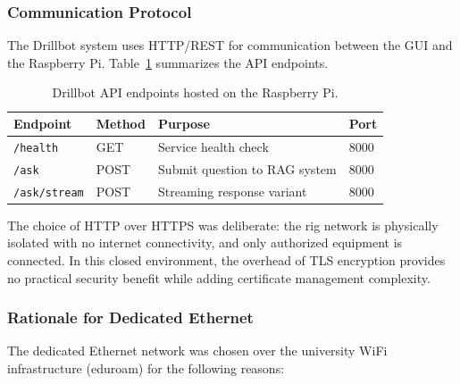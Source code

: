 \subsubsection{Communication Protocol}

The Drillbot system uses HTTP/REST for communication between the GUI and the Raspberry Pi. Table~\ref{tab:api-endpoints} summarizes the API endpoints.

\begin{table}[htbp]
    \centering
    \caption{Drillbot API endpoints hosted on the Raspberry Pi.}
    \label{tab:api-endpoints}
    \begin{tabular}{llll}
        \toprule
        \textbf{Endpoint} & \textbf{Method} & \textbf{Purpose} & \textbf{Port} \\
        \midrule
        \texttt{/health} & GET & Service health check & 8000 \\
        \texttt{/ask} & POST & Submit question to RAG system & 8000 \\
        \texttt{/ask/stream} & POST & Streaming response variant & 8000 \\
        \bottomrule
    \end{tabular}
\end{table}

The choice of HTTP over HTTPS was deliberate: the rig network is physically isolated with no internet connectivity, and only authorized equipment is connected. In this closed environment, the overhead of TLS encryption provides no practical security benefit while adding certificate management complexity.

\subsubsection{Rationale for Dedicated Ethernet}

The dedicated Ethernet network was chosen over the university WiFi infrastructure (eduroam) for the following reasons:

